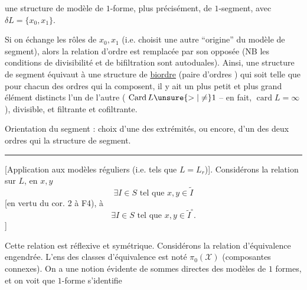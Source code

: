 


une structure de modèle de $1$-forme, \unsure{\{}plus précisément, de $1$-segment\unsure{\}}, avec $\delta L=\{x_0,x_1\}$.

Si on échange les rôles de $x_0,x_1$ (i.e. choisit une autre ``origine'' du modèle de segment), alors la relation d'ordre est remplacée par son opposée (NB les conditions de divisibilité et de bifiltration  sont autoduales). Ainsi, une structure de  segment équivaut à une structure de \uline{biordre} (paire d'ordres ) qui soit telle que pour chacun  des ordres qui la composent, il y ait un plus petit et plus grand élément distincts l'un de l'autre ( $\operatorname{Card}L\unsure{>|\ne}1$ -- en fait, $\operatorname{card}L=\infty$), divisible, et  filtrante et cofiltrante.




Orientation du segment : choix d'une des extrémités, ou encore, d'un des deux ordres qui  la structure de segment.

\begin{center}\rule{3cm}{0.4pt}\end{center}

[Application aux modèles réguliers (i.e. tels que $L=L_r$)]. Considérons la relation sur $L$, en $x,y$
\[
\exists I\in S\text{ tel que }x,y\in\tilde I
\]
[en vertu du cor. 2 à F4),   à
\[
\exists I\in S\text{ tel que }x,y\in\tilde I^\circ.
\]
]

Cette relation est réflexive et symétrique. Considérons la relation d'équivalence engendrée. L'ens des classes d'équivalence est noté $\pi_0(\mathcal X)$ (composantes connexes). On a une notion évidente de sommes directes des modèles de $1$ formes, et on voit que  $1$-forme s'identifie




